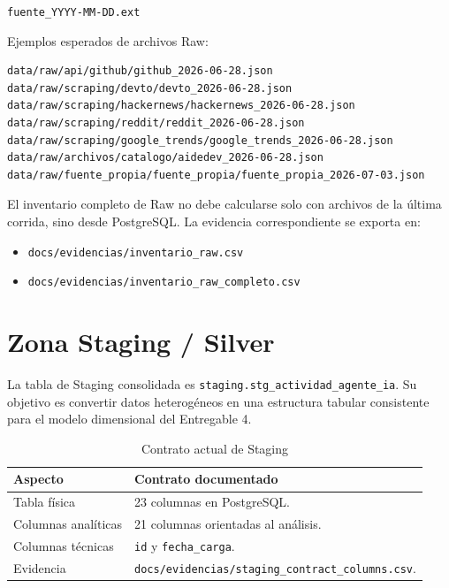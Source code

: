 \documentclass[12pt,a4paper]{article}
\newcommand{\StagingTabla}{\texttt{staging.stg\_actividad\_agente\_ia}}
\newcommand{\pathcode}[1]{\begingroup\footnotesize\ttfamily\nolinkurl{#1}\endgroup}
\begin{document}
\begin{center}
\texttt{fuente\_YYYY-MM-DD.ext}
\end{center}

Ejemplos esperados de archivos Raw:

\begin{verbatim}
data/raw/api/github/github_2026-06-28.json
data/raw/scraping/devto/devto_2026-06-28.json
data/raw/scraping/hackernews/hackernews_2026-06-28.json
data/raw/scraping/reddit/reddit_2026-06-28.json
data/raw/scraping/google_trends/google_trends_2026-06-28.json
data/raw/archivos/catalogo/aidedev_2026-06-28.json
data/raw/fuente_propia/fuente_propia/fuente_propia_2026-07-03.json
\end{verbatim}

El inventario completo de Raw no debe calcularse solo con archivos de la \'ultima corrida, sino desde PostgreSQL. La evidencia correspondiente se exporta en:

\begin{itemize}[leftmargin=1.2cm]
    \item \pathcode{docs/evidencias/inventario_raw.csv}
    \item \pathcode{docs/evidencias/inventario_raw_completo.csv}
\end{itemize}

\section{Zona Staging / Silver}

La tabla de Staging consolidada es \StagingTabla{}. Su objetivo es convertir datos heterog\'eneos en una estructura tabular consistente para el modelo dimensional del Entregable 4.

\begin{table}[H]
\centering
\footnotesize
{}
\begin{tabular}{|P{4cm}|P{9.2cm}|}
\hline
{}
\textbf{Aspecto} & \textbf{Contrato documentado} \\ \hline
Tabla f\'isica & 23 columnas en PostgreSQL. \\ \hline
Columnas anal\'iticas & 21 columnas orientadas al an\'alisis. \\ \hline
Columnas t\'ecnicas & \pathcode{id} y \pathcode{fecha_carga}. \\ \hline
Evidencia & \pathcode{docs/evidencias/staging_contract_columns.csv}. \\ \hline
\end{tabular}
\caption{Contrato actual de Staging}
\end{table}
\end{document}
